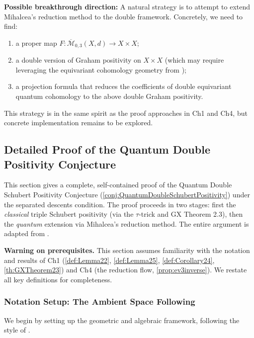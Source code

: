 \textbf{Possible breakthrough direction:} A natural strategy is to attempt to extend Mihalcea's reduction method to the double framework. Concretely, we need to find:
\begin{enumerate}
\item[$*$] a proper map $F: \overline{\mathcal{M}}_{0,3}(X,d) \to X \times X$;
\item[$*$] a double version of Graham positivity on $X \times X$ (which may require leveraging the equivariant cohomology geometry from \cite{AndersonFulton});
\item[$*$] a projection formula that reduces the coefficients of double equivariant quantum cohomology to the above double Graham positivity.
\end{enumerate}
This strategy is in the same spirit as the proof approaches in Ch1 and Ch4, but concrete implementation remains to be explored.

\subsection{Detailed Proof of the Quantum Double Positivity Conjecture}
\label{sec:DetailedQuantumDoubleProof}

This section gives a complete, self-contained proof of the Quantum Double Schubert Positivity Conjecture (\cref{conj:QuantumDoubleSchubertPositivity}) under the separated descents condition. The proof proceeds in two stages: first the \emph{classical} triple Schubert positivity (via the $\tau$-trick and GX Theorem 2.3), then the \emph{quantum} extension via Mihalcea's reduction method. The entire argument is adapted from \cite[Section 2]{GX2025}.

\bigskip
\noindent\textbf{Warning on prerequisites.} This section assumes familiarity with the notation and results of Ch1 (\cref{def:Lemma22}, \cref{def:Lemma25}, \cref{def:Corollary24}, \cref{th:GXTheorem23}) and Ch4 (the reduction flow, \cref{prop:ev3inverse}). We restate all key definitions for completeness.

\bigskip

\subsubsection{Notation Setup: The Ambient Space Following \cite[§2.1]{GX2025}}
\label{sec:GL2nSetup}

We begin by setting up the geometric and algebraic framework, following the style of \cite[Section 2.1]{GX2025}.

